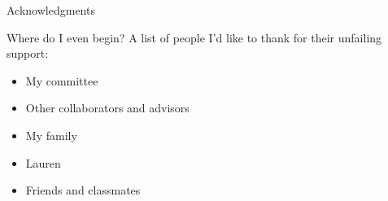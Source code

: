 %
%
%
%

\vspace*{1cm}
\begin{center}
{\large Acknowledgments}
\end{center}

Where do I even begin? A list of people I'd like to thank for their unfailing
support:
\begin{itemize}

	\item My committee

	\item Other collaborators and advisors

	\item My family

	\item Lauren

	\item Friends and classmates

\end{itemize}


\clearpage


